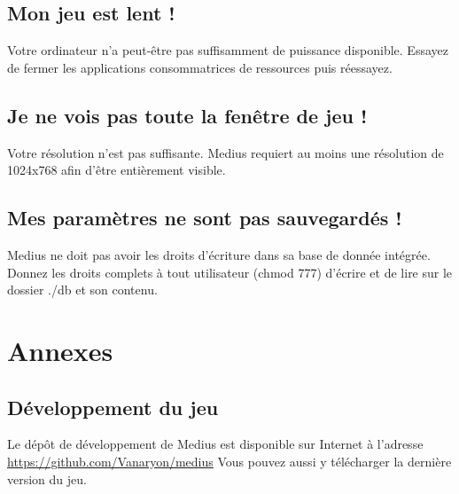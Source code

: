 \documentclass{article}
\begin{document}
\subsection{Mon jeu est lent !}

Votre ordinateur n'a peut-être pas suffisamment de puissance disponible. Essayez de fermer les applications consommatrices de ressources puis réessayez.
\newline\newline

\subsection{Je ne vois pas toute la fenêtre de jeu !}

Votre résolution n'est pas suffisante. Medius requiert au moins une résolution de 1024x768 afin d'être entièrement visible.
\newline\newline

\subsection{Mes paramètres ne sont pas sauvegardés !}

Medius ne doit pas avoir les droits d'écriture dans sa base de donnée intégrée. Donnez les droits complets à tout utilisateur (chmod 777) d'écrire et de lire sur le dossier ./db et son contenu.
\newline\newline

\section{Annexes}

\subsection{Développement du jeu}

Le dépôt de développement de Medius est disponible sur Internet à l'adresse \href{https://github.com/Vanaryon/medius}{https://github.com/Vanaryon/medius}
\newline\newline
Vous pouvez aussi y télécharger la dernière version du jeu.
\newline\newline
\end{document}
